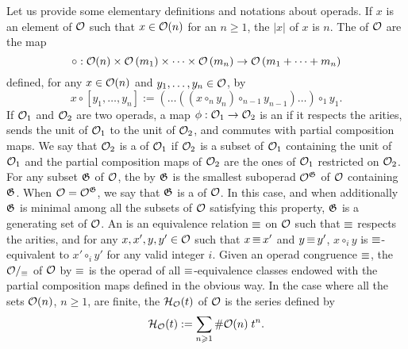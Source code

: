 Let us provide some elementary definitions and notations about operads.
If $x$ is an element of $\mathcal{O}$ such that $x \in \mathcal{O}(n)$ for an
$n \geq 1$, the  $|x|$ of $x$ is $n$. The
 of $\mathcal{O}$ are the map
\begin{equation}
    \circ : \mathcal{O}(n) \times
    \mathcal{O}\left(m_1\right) \times \dots \times \mathcal{O}\left(m_n\right)
    \to \mathcal{O}\left(m_1 + \dots + m_n\right)
\end{equation}
defined, for any $x \in \mathcal{O}(n)$ and $y_1, \dots, y_n \in \mathcal{O}$, by
\begin{equation}
    x \circ \left[y_1, \dots, y_n\right] :=
    \left(\dots \left(\left(x \circ_n y_n\right)
    \circ_{n - 1} y_{n - 1}\right) \dots\right) \circ_1 y_1.
\end{equation}
If $\mathcal{O}_1$ and $\mathcal{O}_2$ are two operads, a map
$\phi : \mathcal{O}_1 \to \mathcal{O}_2$ is an  if it respects
the arities, sends the unit of $\mathcal{O}_1$ to the unit of $\mathcal{O}_2$, and
commutes with partial composition maps. We say that $\mathcal{O}_2$ is a
 of $\mathcal{O}_1$ if $\mathcal{O}_2$ is a subset of $\mathcal{O}_1$
containing the unit of $\mathcal{O}_1$ and the partial composition maps of
$\mathcal{O}_2$ are the ones of $\mathcal{O}_1$ restricted on $\mathcal{O}_2$. For any subset
$\mathfrak{G}$ of $\mathcal{O}$, the  by
$\mathfrak{G}$ is the smallest suboperad $\mathcal{O}^{\mathfrak{G}}$ of
$\mathcal{O}$ containing $\mathfrak{G}$. When $\mathcal{O} = \mathcal{O}^{\mathfrak{G}}$,
we say that $\mathfrak{G}$ is a  of $\mathcal{O}$. In
this case, and when additionally $\mathfrak{G}$ is minimal among all
the subsets of $\mathcal{O}$ satisfying this property, $\mathfrak{G}$ is a
 generating set of $\mathcal{O}$. An  is an
equivalence relation $\operatorname{\equiv}$ on $\mathcal{O}$ such that $\operatorname{\equiv}$ respects the
arities, and for any $x, x', y, y' \in \mathcal{O}$ such that $x \operatorname{\equiv} x'$ and
$y \operatorname{\equiv} y'$, $x \circ_i y$ is $\operatorname{\equiv}$-equivalent to $x' \circ_i y'$
for any valid integer $i$. Given an operad congruence $\operatorname{\equiv}$, the
 $\mathcal{O}/_{\operatorname{\equiv}}$ of $\mathcal{O}$ by $\operatorname{\equiv}$ is the
operad of all $\operatorname{\equiv}$-equivalence classes endowed with the partial
composition maps defined in the obvious way. In the case where all the
sets $\mathcal{O}(n)$, $n \geq 1$, are finite, the 
$\mathcal{H}_{\mathcal{O}}(t)$ of $\mathcal{O}$ is the series defined by
\begin{equation} \label{equ:hilbert_series}
    \mathcal{H}_{\mathcal{O}}(t) := \sum_{n \geqslant 1} \# \mathcal{O}(n) \; t^n.
\end{equation}
\medbreak

